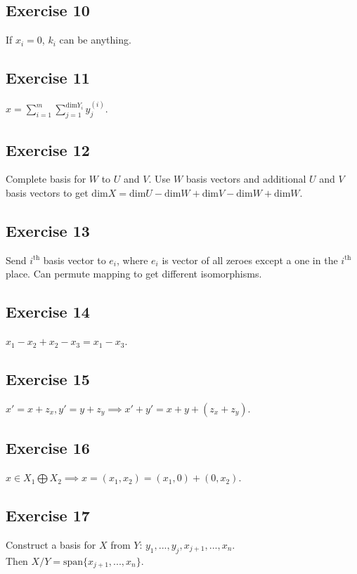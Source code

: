 \subsection{Exercise 10}
 If $x_i = 0$, $k_i$ can be anything.

 \subsection{Exercise 11}
 $x = \sum_{i=1}^{m} \sum_{j=1}^{\text{dim}Y_i} y_j^{(i)}$.

 \subsection{Exercise 12}
 Complete basis for $W$ to  $U$ and  $V$. Use  $W$ basis vectors and additional  $U$ and $V$ basis vectors to get
 $\text{dim}X = \text{dim}U - \text{dim}W + \text{dim}V - \text{dim}W + \text{dim}W$.

 \subsection{Exercise 13}
 Send $i^{\text{th}}$ basis vector to $e_i$, where $e_i$ is vector of all zeroes except a one in the  $i^{\text{th}}$ place.
 Can permute mapping to get different isomorphisms.

 \subsection{Exercise 14}
 $x_1 - x_2 + x_2 - x_3 = x_1 - x_3$.

 \subsection{Exercise 15}
 $x' = x + z_x, y' = y + z_y \implies x' + y' = x + y + (z_x + z_y)$.

 \subsection{Exercise 16}
 $x \in X_1 \bigoplus X_2 \implies x = (x_1, x_2) = (x_1, 0) + (0, x_2)$.

 \subsection{Exercise 17}
 Construct a basis for $X$ from  $Y$:
 $y_1, ..., y_j, x_{j+1}, ..., x_n$.
 \\ 
 Then $X / Y = \text{span}\{x_{j+1}, ..., x_n\}$.

